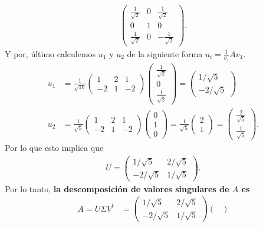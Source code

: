 \documentclass[11pt,letterpaper]{article}
\begin{document}
\begin{enumerate}
\begin{align*}
\begin{pmatrix}
\frac{1}{\sqrt{2}} & 0 & \frac{1}{\sqrt{2}}\\
0  & 1& 0\\
\frac{1}{\sqrt{2}} & 0 & -\frac{1}{\sqrt{2}}
\end{pmatrix}.
\end{align*}
Y por, último calculemos $u_1$ y $u_2$ de la siguiente forma
$u_i= \frac{1}{\sigma_i} A v_1.$
\begin{align*}
u_1&=\frac{1}{\sqrt{10}} \begin{pmatrix}
1 & 2 & 1\\
-2 & 1 & -2
\end{pmatrix}\begin{pmatrix}
\frac{1}{\sqrt{2}} \\ 0\\ \frac{1}{\sqrt{2}}
\end{pmatrix}= \begin{pmatrix}
1/\sqrt{5}\\
-2/\sqrt{5}
\end{pmatrix}\\
u_2&=\frac{1}{\sqrt{5}} \begin{pmatrix}
1 & 2 & 1\\
-2 & 1 & -2
\end{pmatrix}\begin{pmatrix}
0\\ 1 \\0 
\end{pmatrix}= \frac{1}{\sqrt{5}} \begin{pmatrix}
2\\1
\end{pmatrix}=  \begin{pmatrix}
\frac{2}{\sqrt{5}}\\
\frac{1}{\sqrt{5}}
\end{pmatrix}.
\end{align*}
Por lo que esto implica que 
\begin{align*}
U = \begin{pmatrix}
1/\sqrt{5} & 2/\sqrt{5}\\
-2/\sqrt{5} & 1/\sqrt{5}
\end{pmatrix}.
\end{align*}
Por lo tanto, \textbf{la descomposición de valores singulares de $A$ es}
\begin{align*}
A =U\Sigma V^t&= \begin{pmatrix}
1/\sqrt{5} & 2/\sqrt{5}\\
-2/\sqrt{5} & 1/\sqrt{5}
\end{pmatrix}
\begin{pmatrix}

\end{pmatrix}
\end{align*}
\end{enumerate}
\end{document}
